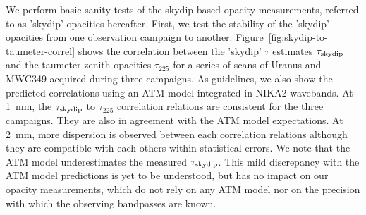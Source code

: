 We perform basic sanity tests of the skydip-based opacity
measurements, referred to as 'skydip' opacities hereafter.
First, we test the stability of the 'skydip' opacities from one
observation campaign to another.
Figure~\ref{fig:skydip-to-taumeter-correl} shows the
correlation between the 'skydip' $\tau$ estimates $\tau_{\rm{skydip}}$
and the taumeter zenith opacities $\tau_{225}$ for a series of scans
of Uranus and MWC349 acquired during three campaigns. As guidelines,
we also show the predicted correlations using an ATM model integrated
in NIKA2 wavebands. At 1~mm, the
$\tau_{\rm{skydip}}$ to $\tau_{225}$ correlation relations are
consistent for the three campaigns. They are
also in agreement with the ATM model expectations. At 2~mm, more
dispersion is observed between each correlation relations although
they are compatible with each others within statistical errors.
We note that the ATM model underestimates the
measured $\tau_{\rm{skydip}}$. This mild discrepancy with the
ATM model predictions is yet to be understood, but has no impact on
our opacity measurements, which do not rely on any ATM model nor on
the precision with which the observing bandpasses are known.


